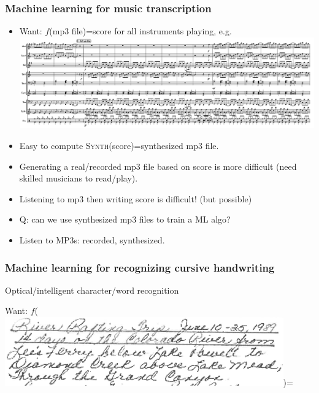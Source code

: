 \documentclass{beamer}
\begin{document}
\begin{frame}
  \frametitle{Machine learning for music transcription}

  \begin{itemize}
   \item Want: $f$(mp3 file)=score for all instruments playing, e.g.
\includegraphics[width=\textwidth]{music-transcription/BFD-page2}
\item Easy to compute \textsc{Synth}(score)=synthesized mp3 file.
  \item Generating a real/recorded mp3 file based on score is more difficult
  (need skilled musicians to read/play).
\item Listening to mp3 then writing score is difficult! (but possible)
\item Q: can we use synthesized mp3 files to train a ML algo?
\item  Listen to MP3s: recorded, synthesized.
  \end{itemize}
\end{frame}

\begin{frame}
  \frametitle{Machine learning for recognizing cursive handwriting}

Optical/intelligent character/word recognition 

Want: $f$(\includegraphics[width=0.9\textwidth]{grandma-handwriting/grand-canyon-page1-paragraph1})=


\end{frame}
\end{document}
